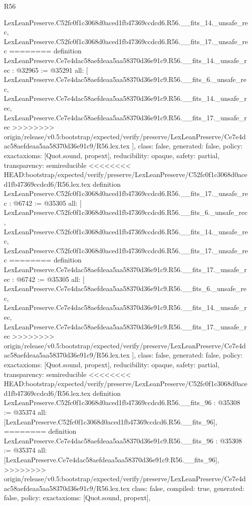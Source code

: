\begin{lexlean}{R56}
\begin{coremodule}
{{{{{{{{{{{{{{{{{{{{{{{{{{{{{{{{{{{{{{{{{{{{{{{{{{{{{{{{{{{{{{{{{{{{{{{{{{{{{{{{{{{{{{{{{{{{{{{{{{{{{{{{{{{{{{{{{{{{{{{{{{{{{{{{{{{{{{{{{{{{{{{{{{{{{{{{{{{{{{{{{{    LexLeanPreserve.C52fc0f1c3068d0aced1fb47369ccdcd6.R56.__fits_14._unsafe_rec,
    LexLeanPreserve.C52fc0f1c3068d0aced1fb47369ccdcd6.R56.__fits_17._unsafe_rec
========
definition LexLeanPreserve.Ce7e4dac58aefdeaa5aa58370d36e91c9.R56.__fits_14._unsafe_rec : @32965 := @35291 {
  all: [
    LexLeanPreserve.Ce7e4dac58aefdeaa5aa58370d36e91c9.R56.__fits_6._unsafe_rec,
    LexLeanPreserve.Ce7e4dac58aefdeaa5aa58370d36e91c9.R56.__fits_14._unsafe_rec,
    LexLeanPreserve.Ce7e4dac58aefdeaa5aa58370d36e91c9.R56.__fits_17._unsafe_rec
>>>>>>>> origin/release/v0.5:bootstrap/expected/verify/preserve/LexLeanPreserve/Ce7e4dac58aefdeaa5aa58370d36e91c9/R56.lex.tex
  ],
  class: false,
  generated: false,
  policy: exact{axioms: [Quot.sound, propext]},
  reducibility: opaque{},
  safety: partial,
  transparency: semireducible
}
<<<<<<<< HEAD:bootstrap/expected/verify/preserve/LexLeanPreserve/C52fc0f1c3068d0aced1fb47369ccdcd6/R56.lex.tex
definition LexLeanPreserve.C52fc0f1c3068d0aced1fb47369ccdcd6.R56.__fits_17._unsafe_rec : @6742 := @35305 {
  all: [
    LexLeanPreserve.C52fc0f1c3068d0aced1fb47369ccdcd6.R56.__fits_6._unsafe_rec,
    LexLeanPreserve.C52fc0f1c3068d0aced1fb47369ccdcd6.R56.__fits_14._unsafe_rec,
    LexLeanPreserve.C52fc0f1c3068d0aced1fb47369ccdcd6.R56.__fits_17._unsafe_rec
========
definition LexLeanPreserve.Ce7e4dac58aefdeaa5aa58370d36e91c9.R56.__fits_17._unsafe_rec : @6742 := @35305 {
  all: [
    LexLeanPreserve.Ce7e4dac58aefdeaa5aa58370d36e91c9.R56.__fits_6._unsafe_rec,
    LexLeanPreserve.Ce7e4dac58aefdeaa5aa58370d36e91c9.R56.__fits_14._unsafe_rec,
    LexLeanPreserve.Ce7e4dac58aefdeaa5aa58370d36e91c9.R56.__fits_17._unsafe_rec
>>>>>>>> origin/release/v0.5:bootstrap/expected/verify/preserve/LexLeanPreserve/Ce7e4dac58aefdeaa5aa58370d36e91c9/R56.lex.tex
  ],
  class: false,
  generated: false,
  policy: exact{axioms: [Quot.sound, propext]},
  reducibility: opaque{},
  safety: partial,
  transparency: semireducible
}
<<<<<<<< HEAD:bootstrap/expected/verify/preserve/LexLeanPreserve/C52fc0f1c3068d0aced1fb47369ccdcd6/R56.lex.tex
definition LexLeanPreserve.C52fc0f1c3068d0aced1fb47369ccdcd6.R56.__fits_96 : @35308 := @35374 {
  all: [LexLeanPreserve.C52fc0f1c3068d0aced1fb47369ccdcd6.R56.__fits_96],
========
definition LexLeanPreserve.Ce7e4dac58aefdeaa5aa58370d36e91c9.R56.__fits_96 : @35308 := @35374 {
  all: [LexLeanPreserve.Ce7e4dac58aefdeaa5aa58370d36e91c9.R56.__fits_96],
>>>>>>>> origin/release/v0.5:bootstrap/expected/verify/preserve/LexLeanPreserve/Ce7e4dac58aefdeaa5aa58370d36e91c9/R56.lex.tex
  class: false,
  compiled: true,
  generated: false,
  policy: exact{axioms: [Quot.sound, propext]},
}}}}}}}}}}}}}}}}}}}}}}}}}}}}}}}}}}}}}}}}}}}}}}}}}}}}}}}}}}}}}}}}}}}}}}}}}}}}}}}}}}}}}}}}}}}}}}}}}}}}}}}}}}}}}}}}}}}}}}}}}}}}}}}}}}}}}}}}}}}}}}}}}}}}}}}}}}}}}}}}}}}}}
\end{coremodule}
\end{lexlean}
